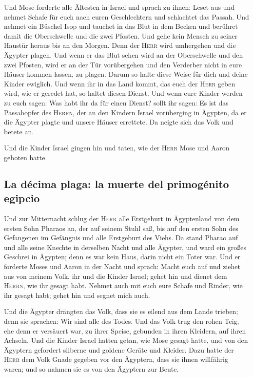  Und Mose forderte alle Ältesten in Israel und sprach zu
ihnen: Leset aus und nehmet Schafe für euch nach euren Geschlechtern und
schlachtet das Passah.  Und nehmet ein Büschel Isop und
tauchet in das Blut in dem Becken und berühret damit die Oberschwelle
und die zwei Pfosten. Und gehe kein Mensch zu seiner Haustür heraus bis
an den Morgen.  Denn der \textsc{Herr} wird umhergehen
und die Ägypter plagen. Und wenn er das Blut sehen wird an der
Oberschwelle und den zwei Pfosten, wird er an der Tür vorübergehen und
den Verderber nicht in eure Häuser kommen lassen, zu plagen.
 Darum so halte diese Weise für dich und deine Kinder
ewiglich.  Und wenn ihr in das Land kommt, das euch der
\textsc{Herr} geben wird, wie er geredet hat, so haltet diesen Dienst.
 Und wenn eure Kinder werden zu euch sagen: Was habt ihr
da für einen Dienst?  sollt ihr sagen: Es ist das
Passahopfer des \textsc{Herrn}, der an den Kindern Israel vorüberging in
Ägypten, da er die Ägypter plagte und unsere Häuser errettete. Da neigte
sich das Volk und betete an.

 Und die Kinder Israel gingen hin und taten, wie der
\textsc{Herr} Mose und Aaron geboten hatte.

\hypertarget{la-duxe9cima-plaga-la-muerte-del-primoguxe9nito-egipcio}{%
\subsection{La décima plaga: la muerte del primogénito
egipcio}\label{la-duxe9cima-plaga-la-muerte-del-primoguxe9nito-egipcio}}

 Und zur Mitternacht schlug der \textsc{Herr} alle
Erstgeburt in Ägyptenland von dem ersten Sohn Pharaos an, der auf seinem
Stuhl saß, bis auf den ersten Sohn des Gefangenen im Gefängnis und alle
Erstgeburt des Viehs.  Da stand Pharao auf und alle seine
Knechte in derselben Nacht und alle Ägypter, und ward ein großes
Geschrei in Ägypten; denn es war kein Haus, darin nicht ein Toter war.
 Und er forderte Moses und Aaron in der Nacht und sprach:
Macht euch auf und ziehet aus von meinem Volk, ihr und die Kinder
Israel; gehet hin und dienet dem \textsc{Herrn}, wie ihr gesagt habt.
 Nehmet auch mit euch eure Schafe und Rinder, wie ihr
gesagt habt; gehet hin und segnet mich auch.

 Und die Ägypter drängten das Volk, dass sie es eilend
aus dem Lande trieben; denn sie sprachen: Wir sind alle des Todes.
 Und das Volk trug den rohen Teig, ehe denn er versäuert
war, zu ihrer Speise, gebunden in ihren Kleidern, auf ihren Achseln.
 Und die Kinder Israel hatten getan, wie Mose gesagt
hatte, und von den Ägyptern gefordert silberne und goldene Geräte und
Kleider.  Dazu hatte der \textsc{Herr} dem Volk Gnade
gegeben vor den Ägyptern, dass sie ihnen willfährig waren; und so nahmen
sie es von den Ägyptern zur Beute.

